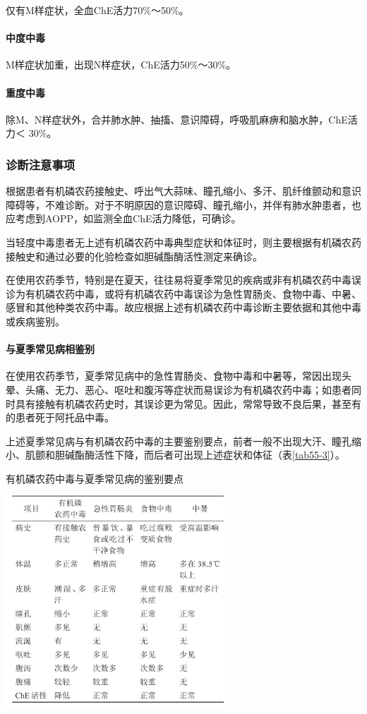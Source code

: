 仅有M样症状，全血ChE活力70\%～50\%。

\paragraph{中度中毒}

M样症状加重，出现N样症状，ChE活力50\%～30\%。

\paragraph{重度中毒}

除M、N样症状外，合并肺水肿、抽搐、意识障碍，呼吸肌麻痹和脑水肿，ChE活力＜
30\%。

\subsubsection{诊断注意事项}

根据患者有机磷农药接触史、呼出气大蒜味、瞳孔缩小、多汗、肌纤维颤动和意识障碍等，不难诊断。对于不明原因的意识障碍、瞳孔缩小，并伴有肺水肿患者，也应考虑到AOPP，如监测全血ChE活力降低，可确诊。

当轻度中毒患者无上述有机磷农药中毒典型症状和体征时，则主要根据有机磷农药接触史和通过必要的化验检查如胆碱酯酶活性测定来确诊。

在使用农药季节，特别是在夏天，往往易将夏季常见的疾病或非有机磷农药中毒误诊为有机磷农药中毒，或将有机磷农药中毒误诊为急性胃肠炎、食物中毒、中暑、感冒和其他种类农药中毒。故应根据上述有机磷农药中毒诊断主要依据和其他中毒或疾病鉴别。

\paragraph{与夏季常见病相鉴别}

在使用农药季节，夏季常见病中的急性胃肠炎、食物中毒和中暑等，常因出现头晕、头痛、无力、恶心、呕吐和腹泻等症状而易误诊为有机磷农药中毒；如患者同时具有接触有机磷农药史时，其误诊更为常见。因此，常常导致不良后果，甚至有的患者死于阿托品中毒。

上述夏季常见病与有机磷农药中毒的主要鉴别要点，前者一般不出现大汗、瞳孔缩小、肌颤和胆碱酯酶活性下降，而后者可出现上述症状和体征（表\ref{tab55-3}）。

\begin{table}[htbp]
\centering
\caption{有机磷农药中毒与夏季常见病的鉴别要点}
\label{tab55-3}
\includegraphics[width=3.32292in,height=3.14583in]{./images/Image00204.jpg}
\end{table}

